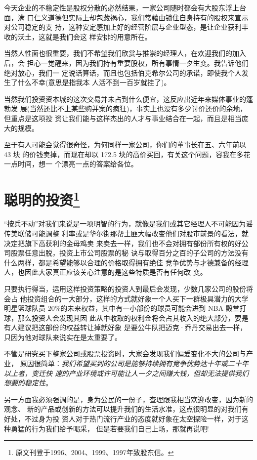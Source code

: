 \documentclass[UTF8,a4paper,zihao=-4,fontset = windows]{ctexart} %
\begin{document}
今天企业的不稳定性是股权分散的必然结果，一家公司随时都会有大股东浮上台面，满
口仁义道德但实际上却包藏祸心，我们常藉由锁住自身持有的股权来宣示对公司稳定的支
持，这种安定感加上好的经营阶层与企业型态，是让企业获利丰收的沃土，这就是我们会这
样安排的用意所在。

当然人性面也很重要，我们不希望我们欣赏与推崇的经理人，在欢迎我们的加入后，会
担心一觉醒来，因为我们持有重要股权，所有事情一夕生变。我告诉他们绝对放心，我们一
定说话算话，而且也包括伯克希尔公司的承诺，即使我个人发生了什么不幸(意思是指我本
人活不到一百岁就挂了)。

当然我们投资资本城的这次交易并未占到什么便宜，这反应出近年来媒体事业的蓬勃发
展(当然还比不上某些购并案的疯狂)，事实上也没有多少讨价还价的余地，但重点是这项投
资让我们能与这样杰出的人才与事业结合在一起，而且是相当庞大的规模。

至于有人可能会觉得很奇怪，为何同样一家公司，你们的董事长在五、六年前以 43 块
的价钱卖掉，而现在却以 172.5 块的高价买回，有关这个问题，容我在多花一点时间，想一
个漂亮一点的答案给各位。

\section[聪明的投资]{聪明的投资\footnote{原文刊登于1996、2004、1999、1997年致股东信。}}

“按兵不动”对我们来说是一项明智的行为，就像是我们或其它经理人不可能因为谣传美联储可能调整
利率或是华尔街那帮土匪大幅改变他们对股市前景的看法，就决定把旗下高获利的金母鸡卖
来卖去一样，我们也不会对拥有部份所有权的好公司股票任意出脱，投资上市公司股票的秘
诀与取得百分之百的子公司的方法没有什么两样，都是希望能够以合理的价格取得拥有绝佳
竞争优势与才德兼备的经理人，也因此大家真正应该关心注意的是这些特质是否有任何改
变。

只要执行得当，运用这样投资策略的投资人到最后会发现，少数几家公司的股份将会占
他投资组合的一大部分，这样的方式就好象一个人买下一群极具潜力的大学明星篮球队员
20\%的未来权益，其中有一小部份的球员可能会进到 NBA 殿堂打球，那么投资人会发现其因
此从中收取的权利金将会占其收入的绝大部分，要是有人建议把这部份的权益转让掉就好象
是要公牛队把迈克·乔丹交易出去一样，只因为他对球队来说实在是太重要了。

不管是研究买下整家公司或股票投资时，大家会发现我们偏爱变化不大的公司与产业，
原因很简单：\textit{我们希望买到的公司是能够持续拥有竞争优势达十年或二十年以上者，变迁快
速的产业环境或许可能让人一夕之间赚大钱，但却无法提供我们想要的稳定性}。

另一方面我必须强调的是，身为公民的一份子，查理跟我相当欢迎改变，因为新的观念、
新的产品或创新的方法可以提升我们的生活水准，这点很明显的对我们有好处，不过身为投
资人对于热门流行产业的态度就好象在太空探险一样，对于这种勇猛的行为我们给予喝采，
但是若要我们自己上场，那就再说吧!
\end{document}
